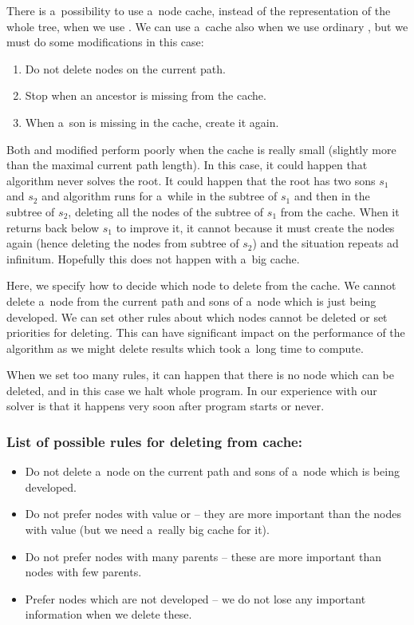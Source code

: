 There is a~possibility to use a~node cache, instead of the representation of the whole
tree, when we use .
We can use a~cache also when we use ordinary , but we must
do some modifications in this case: 

\begin{enumerate}
\item Do not delete nodes on the current path.
\item Stop  when an ancestor is missing from the cache.
\item When a~son is missing in the cache, create it again.
\end{enumerate}

Both  and modified  perform poorly when the
cache is really small (slightly more than the maximal current path length). In
this case, it could happen that algorithm never solves the root. It could happen
that the root has two sons $s_1$ and $s_2$  and algorithm runs for a~while in
the subtree of $s_1$ and then in the subtree of $s_2$, deleting all the nodes
of the subtree of $s_1$ from the cache. When it returns back below $s_1$ to
improve it, it cannot because it must create the nodes again (hence deleting
the nodes from subtree of $s_2$) and the situation repeats ad infinitum.
Hopefully this does not happen with a~big cache.

Here, we specify how to decide which node to delete from the cache. We cannot
delete a~node from the current path and sons of a~node which is just being
developed. We can set other rules about which nodes cannot be deleted or set
priorities for deleting. This can have significant impact on the performance of
the algorithm as we might delete results which took a~long time to compute.

When we set too many rules, it can happen that there is no node which can be
deleted, and in this case we halt whole program. In our experience with our
solver is that it happens very soon after program starts or never.

\subsubsection{List of possible rules for deleting from cache:}
\begin{itemize}
\item Do not delete a~node on the current path and sons of a~node which is being developed.
\item Do not prefer nodes with value  or  -- they are 
more important than the nodes with value  (but we need a~really big
		cache for it).
\item Do not prefer nodes with many parents -- these are more important than nodes
with few parents.
\item Prefer nodes which are not developed -- we do not lose any important information
when we delete these. 
\end{itemize}

